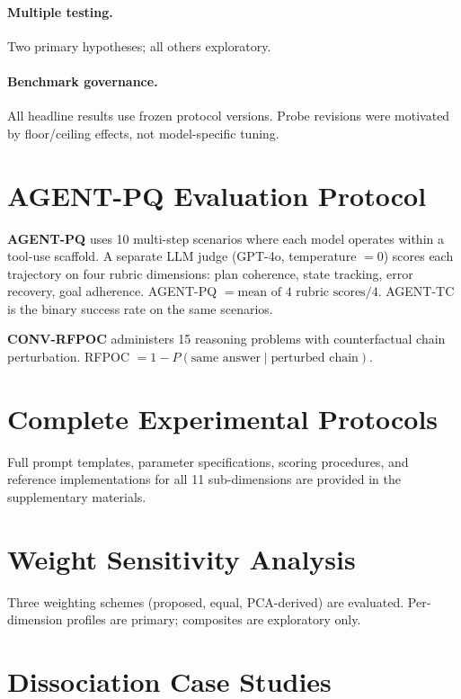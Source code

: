 \documentclass{article}
\begin{document}
\paragraph{Multiple testing.}
Two primary hypotheses; all others exploratory.

\paragraph{Benchmark governance.}
All headline results use frozen protocol versions. Probe revisions were
motivated by floor/ceiling effects, not model-specific tuning.

\section{AGENT-PQ Evaluation Protocol}
\label{app:agentpq}

\textbf{AGENT-PQ} uses 10 multi-step scenarios where each model operates
within a tool-use scaffold. A separate LLM judge (GPT-4o, temperature
$= 0$) scores each trajectory on four rubric dimensions:
plan coherence, state tracking, error recovery, goal adherence.
AGENT-PQ $= \text{mean of 4 rubric scores} / 4$.
AGENT-TC is the binary success rate on the same scenarios.

\textbf{CONV-RFPOC} administers 15 reasoning problems with
counterfactual chain perturbation.
RFPOC $= 1 - P(\text{same answer} \mid \text{perturbed chain})$.

\section{Complete Experimental Protocols}
\label{app:protocols}

Full prompt templates, parameter specifications, scoring procedures, and
reference implementations for all 11 sub-dimensions are provided in the
supplementary materials.

\section{Weight Sensitivity Analysis}
\label{app:weights}

Three weighting schemes (proposed, equal, PCA-derived) are evaluated.
Per-dimension profiles are primary; composites are exploratory only.

\section{Dissociation Case Studies}
\label{app:dissociation}
\end{document}

